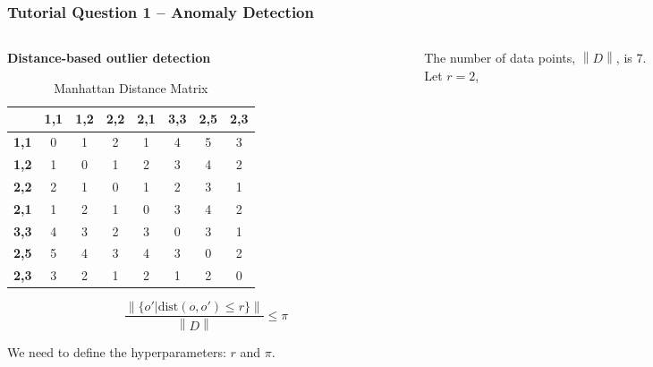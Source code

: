 \documentclass[aspectratio=169, 10pt]{beamer}
\newcommand{\norm}[1]{\left\lVert#1\right\rVert}
\begin{document}
\begin{frame}[t]
    \frametitle{Tutorial Question 1 -- Anomaly Detection}
    \small
    
    \begin{columns}[t]
        \begin{column}{0.5\textwidth}
            \textbf{Distance-based outlier detection}

            \begin{table}[]
                \scriptsize
                \begin{tabular}{c|ccccccc}
                             & \textbf{1,1} & \textbf{1,2} & \textbf{2,2} & \textbf{2,1} & \textbf{3,3} & \textbf{2,5} & \textbf{2,3} \\ \hline
                \textbf{1,1} & 0            & 1            & 2            & 1            & 4            & 5            & 3            \\
                \textbf{1,2} & 1            & 0            & 1            & 2            & 3            & 4            & 2            \\
                \textbf{2,2} & 2            & 1            & 0            & 1            & 2            & 3            & 1            \\
                \textbf{2,1} & 1            & 2            & 1            & 0            & 3            & 4            & 2            \\
                \textbf{3,3} & 4            & 3            & 2            & 3            & 0            & 3            & 1            \\
                \textbf{2,5} & 5            & 4            & 3            & 4            & 3            & 0            & 2            \\
                \textbf{2,3} & 3            & 2            & 1            & 2            & 1            & 2            & 0           
                \end{tabular}
                \caption{Manhattan Distance Matrix}
            \end{table}

            \[
                \frac{\norm{\{o' | \text{dist}(o, o') \le r\}}}{\norm{D}} \le \pi
            \]

            We need to define the hyperparameters: $r$ and $\pi$.
        \end{column}
        \begin{column}{0.5\textwidth}
            The number of data points, $\norm{D}$, is 7.\\
            Let $r=2$,


\end{column}
\end{columns}
\end{frame}
\end{document}
